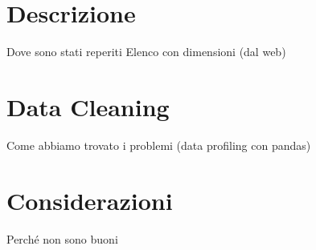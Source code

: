 \section{Descrizione}
Dove sono stati reperiti
Elenco con dimensioni (dal web)

\section{Data Cleaning}
Come abbiamo trovato i problemi (data profiling con pandas)

\section{Considerazioni}
Perché non sono buoni
